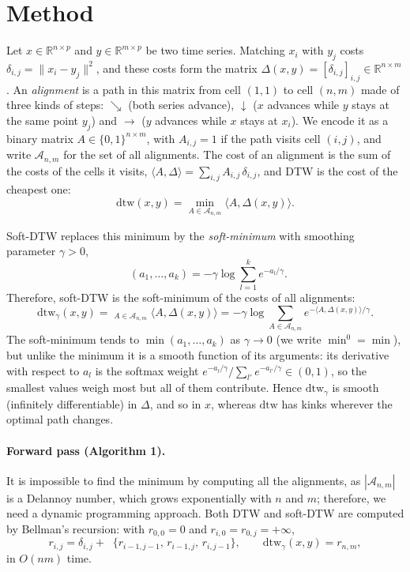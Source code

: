 \documentclass[11pt]{article}
\providecommand{\R}{\mathbb{R}}
\newcommand{\sdtw}{\mathrm{dtw}_\gamma}
\newcommand{\minop}{\mathop{\mathrm{min}^\gamma}}
\begin{document}
\section{Method}

Let $x\in\R^{n\times p}$ and $y\in\R^{m\times p}$ be two time series. Matching $x_i$ with $y_j$ costs $\delta_{i,j}=\|x_i-y_j\|^2$, and these costs form the matrix $\Delta(x,y)=[\delta_{i,j}]_{i,j}\in\R^{n\times m}$. An \emph{alignment} is a path in this matrix from cell $(1,1)$ to cell $(n,m)$ made of three kinds of steps: $\searrow$ (both series advance), $\downarrow$ ($x$ advances while $y$ stays at the same point $y_j$) and $\rightarrow$ ($y$ advances while $x$ stays at $x_i$). We encode it as a binary matrix $A\in\{0,1\}^{n\times m}$, with $A_{i,j}=1$ if the path visits cell $(i,j)$, and write $\mathcal A_{n,m}$ for the set of all alignments. The cost of an alignment is the sum of the costs of the cells it visits, $\langle A,\Delta\rangle=\sum_{i,j}A_{i,j}\,\delta_{i,j}$, and DTW is the cost of the cheapest one:
\begin{equation}
\mathrm{dtw}(x,y)=\min_{A\in\mathcal A_{n,m}}\langle A,\Delta(x,y)\rangle .
\end{equation}

Soft-DTW replaces this minimum by the \emph{soft-minimum} with smoothing parameter $\gamma>0$,
\begin{equation}
\minop(a_1,\dots,a_k)=-\gamma\log\sum_{l=1}^{k}e^{-a_l/\gamma}.
\end{equation}
Therefore, soft-DTW is the soft-minimum of the costs of all alignments:
\begin{equation}
\sdtw(x,y)=\minop_{A\in\mathcal A_{n,m}}\langle A,\Delta(x,y)\rangle=-\gamma\log\sum_{A\in\mathcal A_{n,m}}e^{-\langle A,\Delta(x,y)\rangle/\gamma}.
\end{equation}
The soft-minimum tends to $\min(a_1,\dots,a_k)$ as $\gamma\to0$ (we write $\min^{0}=\min$), but unlike the minimum it is a smooth function of its arguments: its derivative with respect to $a_l$ is the softmax weight $e^{-a_l/\gamma}/\sum_{l'}e^{-a_{l'}/\gamma}\in(0,1)$, so the smallest values weigh most but all of them contribute. Hence $\sdtw$ is smooth (infinitely differentiable) in $\Delta$, and so in $x$, whereas $\mathrm{dtw}$ has kinks wherever the optimal path changes.
\paragraph{Forward pass (Algorithm 1).}
It is impossible to find the minimum by computing all the alignments, as $|\mathcal A_{n,m}|$ is a Delannoy number, which grows exponentially with $n$ and $m$; therefore, we need a dynamic programming approach. Both DTW and soft-DTW are computed by Bellman's recursion: with $r_{0,0}=0$ and $r_{i,0}=r_{0,j}=+\infty$,
\begin{equation}
r_{i,j}=\delta_{i,j}+\minop\{r_{i-1,j-1},\,r_{i-1,j},\,r_{i,j-1}\},\qquad \sdtw(x,y)=r_{n,m},
\end{equation}
in $O(nm)$ time.
\end{document}
